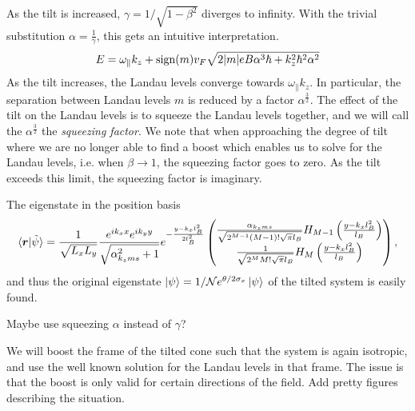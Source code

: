 As the tilt is increased, \(\gamma = 1 / \sqrt{1-\beta ^{2}}\) diverges to infinity.
With the trivial substitution \(\alpha = \frac{1}{\gamma }\), this gets an intuitive interpretation.
\begin{equation}
  \label{eq:22}
  E = \omega _{\parallel} k_{z} + \operatorname{sign}(m) v_{F} \sqrt{2 |m| e B \alpha  ^3 \hbar + k_{z}^2\hbar ^2 \alpha ^2}
\end{equation}
As the tilt increases, the Landau levels converge towards \(\omega _{\parallel} k_{z}\).
In particular, the separation between Landau levels \(m\)  is reduced by a factor \(\alpha ^{\frac{3}{2}}\).
The effect of the tilt on the Landau levels is to squeeze the Landau levels together, and we will call the \(\alpha ^{\frac{3}{2}}\) the \emph{squeezing factor}.
We note that when approaching the degree of tilt where we are no longer able to find a boost which enables us to solve for the Landau levels, i.e. when \(\beta \to 1\), the squeezing factor goes to zero.
As the tilt exceeds this limit, the squeezing factor is imaginary.

The eigenstate in the position basis
\begin{equation}
  \label{eq:27}
  \braket{\bm{r} | \tilde{\psi}} =
  \frac{1}{\sqrt{L_{x} L_{y}}}
  \frac{e^{ik_{x} x} e^{ik_{y} y}}{\sqrt{\alpha _{k_{z} m s}^2 + 1}}
  e^{-\frac{y - k_{x} l_{B}^2}{2 l_{B} ^2}}
  \begin{pmatrix}
    \frac{\alpha _{k_{z} m s}}{\sqrt{
        2^{M-1} (M-1)! \sqrt{\pi} l_{B}
      }}
    H_{M-1} \left(\frac{y-k_{x} l_{B}^2}{l_{B}}\right)\\
    \frac{1}{\sqrt{
        2^{M} M! \sqrt{\pi} l_{B}
      }}
    H_{M} \left(\frac{y-k_{x} l_{B}^2}{l_{B}}\right)\\
  \end{pmatrix},
\end{equation}
and thus the original eigenstate \(\ket{\psi } = 1 /\mathcal{N} e^{\theta /2 \sigma _{x}} \ket{\psi }\) of the tilted system is easily found.



Maybe use squeezing \(\alpha \) instead of \(\gamma \)?





We will boost the frame of the tilted cone such that the system is again isotropic, and use the well known solution for the Landau levels in that frame.
The issue is that the boost is only valid for certain directions of the field.
Add pretty figures describing the situation.

